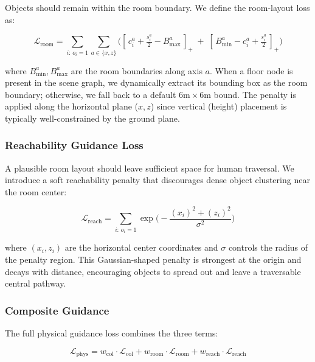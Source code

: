 Objects should remain within the room boundary.
We define the room-layout loss as:

\begin{equation}
\mathcal{L}_{\mathrm{room}} = \sum_{i:\, o_i=1} \sum_{a \in \{x,z\}} \Big(
    [\,c_i^a + \tfrac{s_i^a}{2} - B_{\max}^a\,]_+ \;+\;
    [\,B_{\min}^a - c_i^a + \tfrac{s_i^a}{2}\,]_+
\Big)
\label{eq:room_loss}
\end{equation}

\noindent where $B_{\min}^a, B_{\max}^a$ are the room boundaries along axis $a$.
When a floor node is present in the scene graph, we dynamically extract its bounding box as the room boundary; otherwise, we fall back to a default $6\text{m} \times 6\text{m}$ bound.
The penalty is applied along the horizontal plane ($x, z$) since vertical (height) placement is typically well-constrained by the ground plane.

\subsubsection{Reachability Guidance Loss}
\label{sec:method:walkable_loss}

A plausible room layout should leave sufficient space for human traversal.
We introduce a soft reachability penalty that discourages dense object clustering near the room center:

\begin{equation}
\mathcal{L}_{\mathrm{reach}} = \sum_{i:\, o_i=1} \exp\!\Big(-\frac{(x_i)^2 + (z_i)^2}{\sigma^2}\Big)
\label{eq:walkable_loss}
\end{equation}

\noindent where $(x_i, z_i)$ are the horizontal center coordinates and $\sigma$ controls the radius of the penalty region.
This Gaussian-shaped penalty is strongest at the origin and decays with distance, encouraging objects to spread out and leave a traversable central pathway.

\subsubsection{Composite Guidance}
\label{sec:method:composite}

The full physical guidance loss combines the three terms:

\begin{equation}
\mathcal{L}_{\mathrm{phys}} = w_{\mathrm{col}} \cdot \mathcal{L}_{\mathrm{col}} + w_{\mathrm{room}} \cdot \mathcal{L}_{\mathrm{room}} + w_{\mathrm{reach}} \cdot \mathcal{L}_{\mathrm{reach}}
\label{eq:total_loss}
\end{equation}

